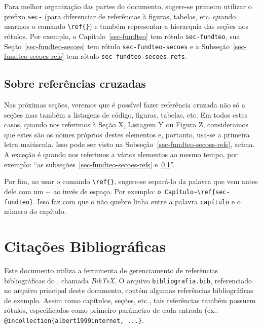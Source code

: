 Para melhor organização das partes do documento, sugere-se primeiro utilizar o prefixo \texttt{sec-} (para diferenciar de referências à figuras, tabelas, etc. quando usarmos o comando \texttt{\textbackslash ref\{\}}) e também representar a hierarquia das seções nos rótulos. Por exemplo, o Capítulo~\ref{sec-fundteo} tem rótulo \texttt{sec-fundteo}, sua Seção~\ref{sec-fundteo-secoes} tem rótulo \texttt{sec-fundteo-secoes} e a Subseção~\ref{sec-fundteo-secoes-refs} tem rótulo \texttt{sec-fundteo-secoes-refs}.



\subsection{Sobre referências cruzadas}
\label{sec-fundteo-secoes-sobrerefs}

Nas próximas seções, veremos que é possível fazer referência cruzada não só a seções mas também a listagens de código, figuras, tabelas, etc. Em todos estes casos, quando nos referimos à Seção X, Listagem Y ou Figura Z, consideramos que estes são os nomes próprios destes elementos e, portanto, usa-se a primeira letra maiúscula. Isso pode ser visto na Subseção~\ref{sec-fundteo-secoes-refs}, acima. A exceção é quando nos referimos a vários elementos ao mesmo tempo, por exemplo: ``as subseções~\ref{sec-fundteo-secoes-refs} e~\ref{sec-fundteo-secoes-sobrerefs}''.

Por fim, ao usar o comando \texttt{\textbackslash ref\{\}}, sugere-se separá-lo da palavra que vem antes dele com um \textasciitilde\ ao invés de espaço. Por exemplo: \texttt{o Capítulo\textasciitilde \textbackslash ref\{sec-fundteo\}}. Isso faz com que o \latex não quebre linha entre a palavra \texttt{capítulo} e o número do capítulo.




\section{Citações Bibliográficas}
\label{sec-fundteo-citacoes}

Este documento utiliza a ferramenta de gerenciamento de referências bibliográficas do \latex, chamada \emph{BibTeX}. O arquivo \texttt{bibliografia.bib}, referenciado no arquivo \latex principal deste documento, contém algumas referências bibliográficas de exemplo. Assim como capítulos, seções, etc., tais referências também possuem rótulos, especificados como primeiro parâmetro de cada entrada (ex.: \texttt{@incollection\{albert1999internet, ...\}}.

